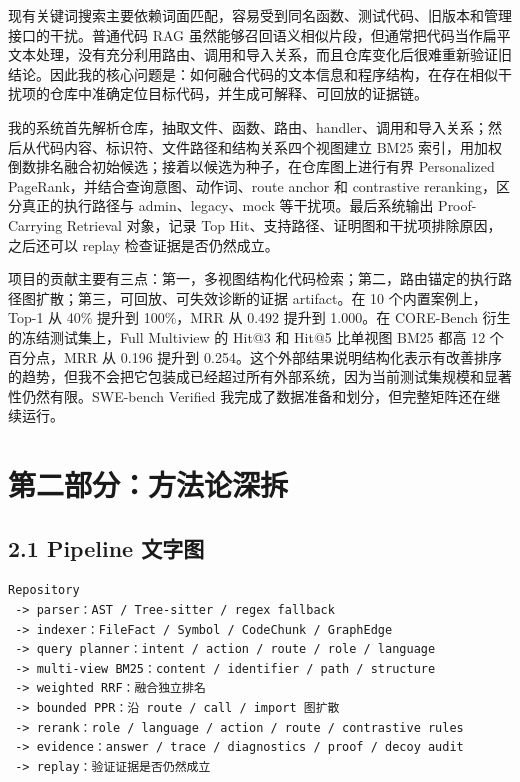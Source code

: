 \documentclass[UTF8,12pt,openany]{ctexbook}
\begin{document}
现有关键词搜索主要依赖词面匹配，容易受到同名函数、测试代码、旧版本和管理接口的干扰。普通代码 RAG 虽然能够召回语义相似片段，但通常把代码当作扁平文本处理，没有充分利用路由、调用和导入关系，而且仓库变化后很难重新验证旧结论。因此我的核心问题是：如何融合代码的文本信息和程序结构，在存在相似干扰项的仓库中准确定位目标代码，并生成可解释、可回放的证据链。\par

我的系统首先解析仓库，抽取文件、函数、路由、handler、调用和导入关系；然后从代码内容、标识符、文件路径和结构关系四个视图建立 BM25 索引，用加权倒数排名融合初始候选；接着以候选为种子，在仓库图上进行有界 Personalized PageRank，并结合查询意图、动作词、route anchor 和 contrastive reranking，区分真正的执行路径与 admin、legacy、mock 等干扰项。最后系统输出 Proof-Carrying Retrieval 对象，记录 Top Hit、支持路径、证明图和干扰项排除原因，之后还可以 replay 检查证据是否仍然成立。\par

项目的贡献主要有三点：第一，多视图结构化代码检索；第二，路由锚定的执行路径图扩散；第三，可回放、可失效诊断的证据 artifact。在 10 个内置案例上，Top-1 从 40\% 提升到 100\%，MRR 从 0.492 提升到 1.000。在 CORE-Bench 衍生的冻结测试集上，Full Multiview 的 Hit@3 和 Hit@5 比单视图 BM25 都高 12 个百分点，MRR 从 0.196 提升到 0.254。这个外部结果说明结构化表示有改善排序的趋势，但我不会把它包装成已经超过所有外部系统，因为当前测试集规模和显著性仍然有限。SWE-bench Verified 我完成了数据准备和划分，但完整矩阵还在继续运行。\par

\clearpage
\chapter{第二部分：方法论深拆}

\section{2.1 Pipeline 文字图}

\begin{lstlisting}
Repository
 -> parser：AST / Tree-sitter / regex fallback
 -> indexer：FileFact / Symbol / CodeChunk / GraphEdge
 -> query planner：intent / action / route / role / language
 -> multi-view BM25：content / identifier / path / structure
 -> weighted RRF：融合独立排名
 -> bounded PPR：沿 route / call / import 图扩散
 -> rerank：role / language / action / route / contrastive rules
 -> evidence：answer / trace / diagnostics / proof / decoy audit
 -> replay：验证证据是否仍然成立
\end{lstlisting}
\end{document}
